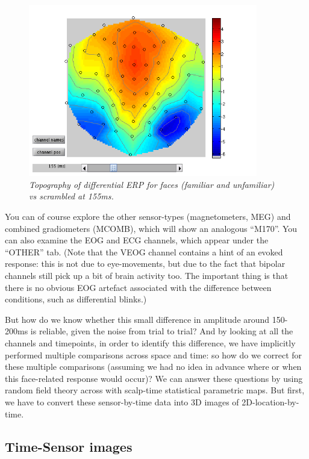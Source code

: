 \begin{figure}
\begin{center}
\includegraphics[width=100mm]{multi/figures/figure4}
\caption{\em Topography of differential ERP for faces (familiar and unfamiliar) vs scrambled at 155ms. \label{multi:fig:4}}
\end{center}
\end{figure}

You can of course explore the other sensor-types (magnetometers, MEG) and combined gradiometers (MCOMB), which will show an analogous ``M170''. You can also examine the EOG and ECG channels, which appear under the ``OTHER'' tab. (Note that the VEOG channel contains a hint of an evoked response: this is not due to eye-movements, but due to the fact that bipolar channels still pick up a bit of brain activity too. The important thing is that there is no obvious EOG artefact associated with the difference between conditions, such as differential blinks.)

But how do we know whether this small difference in amplitude around 150-200ms is reliable, given the noise from trial to trial? And by looking at all the channels and timepoints, in order to identify this difference, we have implicitly performed multiple comparisons across space and time: so how do we correct for these multiple comparisons (assuming we had no idea in advance where or when this face-related response would occur)? We can answer these questions by using random field theory across with scalp-time statistical parametric maps. But first, we have to convert these sensor-by-time data into 3D images of 2D-location-by-time.

\subsection{Time-Sensor images}


